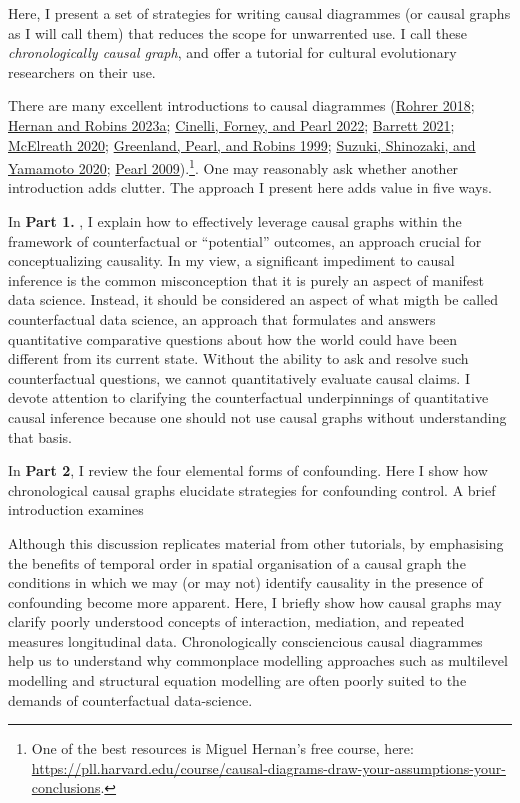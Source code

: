 \documentclass[
  singlecolumn]{report}
\begin{document}
Here, I present a set of strategies for writing causal diagrammes (or
causal graphs as I will call them) that reduces the scope for
unwarrented use. I call these \emph{chronologically causal graph}, and
offer a tutorial for cultural evolutionary researchers on their use.

There are many excellent introductions to causal diagrammes
(\protect\hyperlink{ref-rohrer2018}{Rohrer 2018};
\protect\hyperlink{ref-hernan2023}{Hernan and Robins 2023a};
\protect\hyperlink{ref-cinelli2022}{Cinelli, Forney, and Pearl 2022};
\protect\hyperlink{ref-barrett2021}{Barrett 2021};
\protect\hyperlink{ref-mcelreath2020}{McElreath 2020};
\protect\hyperlink{ref-greenland1999}{Greenland, Pearl, and Robins
1999}; \protect\hyperlink{ref-suzuki2020}{Suzuki, Shinozaki, and
Yamamoto 2020}; \protect\hyperlink{ref-pearl2009}{Pearl
2009}).\footnote{One of the best resources is Miguel Hernan's free
  course, here:
  \url{https://pll.harvard.edu/course/causal-diagrams-draw-your-assumptions-your-conclusions}.}.
One may reasonably ask whether another introduction adds clutter. The
approach I present here adds value in five ways.

In \textbf{Part 1.} , I explain how to effectively leverage causal
graphs within the framework of counterfactual or ``potential'' outcomes,
an approach crucial for conceptualizing causality. In my view, a
significant impediment to causal inference is the common misconception
that it is purely an aspect of manifest data science. Instead, it should
be considered an aspect of what migth be called counterfactual data
science, an approach that formulates and answers quantitative
comparative questions about how the world could have been different from
its current state. Without the ability to ask and resolve such
counterfactual questions, we cannot quantitatively evaluate causal
claims. I devote attention to clarifying the counterfactual
underpinnings of quantitative causal inference because one should not
use causal graphs without understanding that basis.

In \textbf{Part 2}, I review the four elemental forms of confounding.
Here I show how chronological causal graphs elucidate strategies for
confounding control. A brief introduction examines

Although this discussion replicates material from other tutorials, by
emphasising the benefits of temporal order in spatial organisation of a
causal graph the conditions in which we may (or may not) identify
causality in the presence of confounding become more apparent. Here, I
briefly show how causal graphs may clarify poorly understood concepts of
interaction, mediation, and repeated measures longitudinal data.
Chronologically consciencious causal diagrammes help us to understand
why commonplace modelling approaches such as multilevel modelling and
structural equation modelling are often poorly suited to the demands of
counterfactual data-science.
\end{document}
